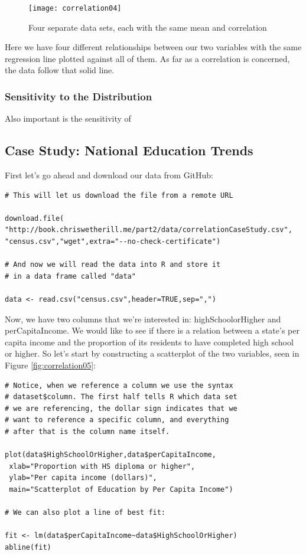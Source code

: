 \begin{figure}[h]
\texttt{[image: correlation04]}
\label{fig:correlation04}
\caption{Four separate data sets, each with the same mean and correlation}
\end{figure}

Here we have four different relationships between our two variables with the same regression line plotted against all of them. As far as a correlation is concerned, the data follow that solid line.

\subsubsection{Sensitivity to the Distribution}
Also important is the sensitivity of 

\subsection{Case Study: National Education Trends}

First let's go ahead and download our data from GitHub:

\begin{framed}
\begin{Verbatim}[samepage=TRUE]
# This will let us download the file from a remote URL

download.file(
"http://book.chriswetherill.me/part2/data/correlationCaseStudy.csv",
"census.csv","wget",extra="--no-check-certificate")

# And now we will read the data into R and store it
# in a data frame called "data"

data <- read.csv("census.csv",header=TRUE,sep=",")
\end{Verbatim}
\end{framed}

Now, we have two columns that we're interested in: highSchoolorHigher and perCapitaIncome. We would like to see if there is a relation between a state's per capita income and the proportion of its residents to have completed high school or higher. So let's start by constructing a scatterplot of the two variables, seen in Figure \ref{fig:correlation05}:

\begin{framed}
\begin{Verbatim}[samepage=TRUE]
# Notice, when we reference a column we use the syntax
# dataset$column. The first half tells R which data set
# we are referencing, the dollar sign indicates that we
# want to reference a specific column, and everything
# after that is the column name itself.

plot(data$HighSchoolOrHigher,data$perCapitaIncome,
 xlab="Proportion with HS diploma or higher",
 ylab="Per capita income (dollars)",
 main="Scatterplot of Education by Per Capita Income")

# We can also plot a line of best fit:

fit <- lm(data$perCapitaIncome~data$HighSchoolOrHigher)
abline(fit)
\end{Verbatim}
\end{framed}

